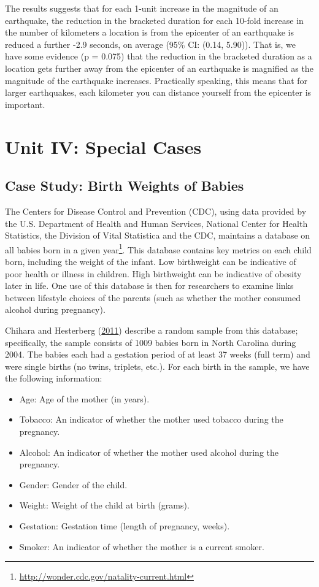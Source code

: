 \documentclass[]{book}
\providecommand{\tightlist}{%
  \setlength{\itemsep}{0pt}\setlength{\parskip}{0pt}}
\let\rmarkdownfootnote\footnote%
\def\footnote{\protect\rmarkdownfootnote}
\theoremstyle{definition}
\theoremstyle{definition}
\theoremstyle{definition}
\theoremstyle{remark}
\begin{document}
The results suggests that for each 1-unit increase in the magnitude of
an earthquake, the reduction in the bracketed duration for each 10-fold
increase in the number of kilometers a location is from the epicenter of
an earthquake is reduced a further -2.9 seconds, on average (95\% CI:
(0.14, 5.90)). That is, we have some evidence (p = 0.075) that the
reduction in the bracketed duration as a location gets further away from
the epicenter of an earthquake is magnified as the magnitude of the
earthquake increases. Practically speaking, this means that for larger
earthquakes, each kilometer you can distance yourself from the epicenter
is important.

\part{Unit IV: Special
Cases}\label{part-unit-iv-special-cases}

\hypertarget{CaseBabies}{\chapter{Case Study: Birth Weights of
Babies}\label{CaseBabies}}

The Centers for Disease Control and Prevention (CDC), using data
provided by the U.S. Department of Health and Human Services, National
Center for Health Statistics, the Division of Vital Statistica and the
CDC, maintains a database on all babies born in a given year\footnote{\url{http://wonder.cdc.gov/natality-current.html}}.
This database contains key metrics on each child born, including the
weight of the infant. Low birthweight can be indicative of poor health
or illness in children. High birthweight can be indicative of obesity
later in life. One use of this database is then for researchers to
examine links between lifestyle choices of the parents (such as whether
the mother consumed alcohol during pregnancy).

Chihara and Hesterberg (\protect\hyperlink{ref-Chihara2011}{2011})
describe a random sample from this database; specifically, the sample
consists of 1009 babies born in North Carolina during 2004. The babies
each had a gestation period of at least 37 weeks (full term) and were
single births (no twins, triplets, etc.). For each birth in the sample,
we have the following information:

\begin{itemize}
\tightlist
\item
  Age: Age of the mother (in years).
\item
  Tobacco: An indicator of whether the mother used tobacco during the
  pregnancy.
\item
  Alcohol: An indicator of whether the mother used alcohol during the
  pregnancy.
\item
  Gender: Gender of the child.
\item
  Weight: Weight of the child at birth (grams).
\item
  Gestation: Gestation time (length of pregnancy, weeks).
\item
  Smoker: An indicator of whether the mother is a current smoker.
\end{itemize}
\end{document}
